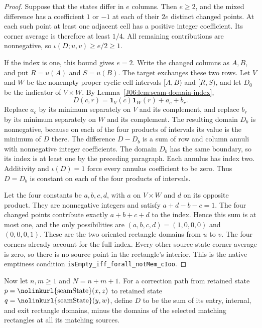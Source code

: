 \documentclass[11pt,oneside]{report}
\theoremstyle{definition}
\numberwithin{equation}{section}
\newcommand{\decl}[1]{\textnormal{\nolinkurl{#1}}}
\begin{document}
\begin{proof}
Suppose that the states differ in $e$ columns. Then $e\ge2$, and the
mixed difference has a coefficient $1$ or $-1$ at each of their $2e$
distinct changed points. At each such point at least one adjacent cell
has a positive integer coefficient. Its corner average is therefore
at least $1/4$. All remaining contributions are nonnegative, so
$\iota(D;u,v)\ge e/2\ge1$.

If the index is one, this bound gives $e=2$. Write the changed columns
as $A,B$, and put $R=u(A)$ and $S=u(B)$. The target exchanges these
two rows. Let $V$ and $W$ be the nonempty proper cyclic cell intervals
$[A,B)$ and $[R,S)$, and let $D_0$ be the indicator of $V\times W$.
By Lemma~\ref{J06:lem:seam-domain-index},
\[
 D(c,r)=\mathbf1_V(c)\mathbf1_W(r)+a_c+b_r.
\]
Replace $a_c$ by its minimum separately on $V$ and its complement,
and replace $b_r$ by its minimum separately on $W$ and its complement.
The resulting domain $D_b$ is nonnegative, because on each of the four
products of intervals its value is the minimum of $D$ there.
The difference $D-D_b$ is a sum of row and column annuli with
nonnegative integer coefficients. The domain $D_b$ has the same
boundary, so its index is at least one by the preceding paragraph.
Each annulus has index two. Additivity and $\iota(D)=1$ force every
annulus coefficient to be zero. Thus $D=D_b$ is constant on each of
the four products of intervals.

Let the four constants be $a,b,c,d$, with $a$ on $V\times W$ and
$d$ on its opposite product. They are nonnegative integers and satisfy
$a+d-b-c=1$. The four changed points contribute exactly
$a+b+c+d$ to the index. Hence this sum is at most one, and the
only possibilities are $(a,b,c,d)=(1,0,0,0)$ and $(0,0,0,1)$.
These are the two oriented rectangle domains from $u$ to $v$.
The four corners already account for the full index. Every other
source-state corner average is zero, so there is no source point in
the rectangle's interior. This is the native emptiness condition
\decl{isEmpty_iff_forall_notMem_cIoo}.
\end{proof}

Now let $n,m\ge1$ and $N=n+m+1$. For a correction path from retained
state $p=\decl{seamState}(x,z)$ to retained state
$q=\decl{seamState}(y,w)$, define $D$ to be the sum of its entry,
internal, and exit rectangle domains, minus the domains of the selected
matching rectangles at all its matching sources.
\end{document}
